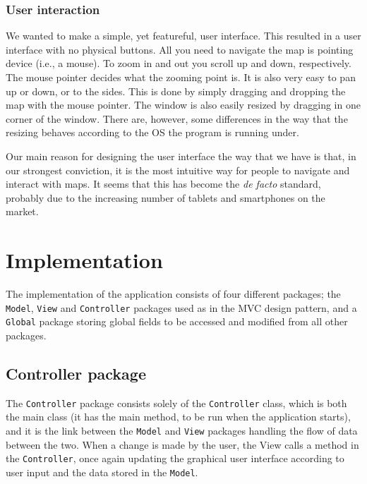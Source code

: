 \documentclass[a4paper,11pt]{article}
\begin{document}
\subsubsection{User interaction} %
\label{subsub:User interaction}
We wanted to make a simple, yet featureful, user interface. This resulted in a user interface with no physical buttons. All you need to navigate the map is pointing device (i.e., a mouse). To zoom in and out you scroll up and down, respectively. The mouse pointer decides what the zooming point is. It is also very easy to pan up or down, or to the sides. This is done by simply dragging and dropping the map with the mouse pointer. The window is also easily resized by dragging in one corner of the window. There are, however, some differences in the way that the resizing behaves according to the OS the program is running under.

Our main reason for designing the user interface the way that we have is that, in our strongest conviction, it is the most intuitive way for people to navigate and interact with maps. It seems that this has become the \textit{de facto} standard, probably due to the increasing number of tablets and smartphones on the market.

\pagebreak
\section{Implementation} %
\label{sec:Implementation} %
The implementation of the application consists of four different packages; the \texttt{Model}, \texttt{View} and \texttt{Controller} packages used as in the MVC design pattern, and a \texttt{Global} package storing global fields to be accessed and modified from all other packages.


\subsection{Controller package} %
The \texttt{Controller} package consists solely of the \texttt{Controller} class, which is both the main class (it has the main method, to be run when the application starts), and it is the link between the \texttt{Model} and \texttt{View} packages handling the flow of data between the two. When a change is made by the user, the View calls a method in the \texttt{Controller}, once again updating the graphical user interface according to user input and the data stored in the \texttt{Model}.
\end{document}

